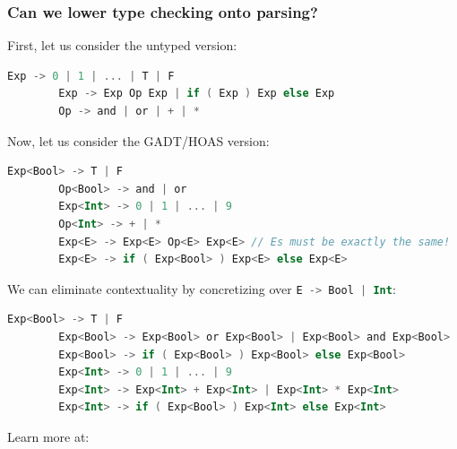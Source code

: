 \documentclass{beamer}
\begin{document}
    \begin{frame}[fragile]
        \frametitle{Can we lower type checking onto parsing?}
        First, let us consider the untyped version:
        \begin{lstlisting}[language=Kotlin, gobble=5]
        Exp -> 0 | 1 | ... | T | F
        Exp -> Exp Op Exp | if ( Exp ) Exp else Exp
        Op -> and | or | + | *
        \end{lstlisting}
        Now, let us consider the GADT/HOAS version:
        \begin{lstlisting}[language=Kotlin, gobble=5]
        Exp<Bool> -> T | F
        Op<Bool> -> and | or
        Exp<Int> -> 0 | 1 | ... | 9
        Op<Int> -> + | *
        Exp<E> -> Exp<E> Op<E> Exp<E> // Es must be exactly the same!
        Exp<E> -> if ( Exp<Bool> ) Exp<E> else Exp<E>
        \end{lstlisting}
        We can eliminate contextuality by concretizing over \lstinline[language=Kotlin]{E -> Bool | Int}:
        \begin{lstlisting}[language=Kotlin, gobble=5]
        Exp<Bool> -> T | F
        Exp<Bool> -> Exp<Bool> or Exp<Bool> | Exp<Bool> and Exp<Bool>
        Exp<Bool> -> if ( Exp<Bool> ) Exp<Bool> else Exp<Bool>
        Exp<Int> -> 0 | 1 | ... | 9
        Exp<Int> -> Exp<Int> + Exp<Int> | Exp<Int> * Exp<Int>
        Exp<Int> -> if ( Exp<Bool> ) Exp<Int> else Exp<Int>
        \end{lstlisting}

    \end{frame}

    \begin{frame}
        \begin{center}
            \Huge{Learn more at: \\~\\
            \href{http://array22.ndan.co}{\color{blue}{http://array22.ndan.co}}}
        \end{center}
    \end{frame}
\end{document}
